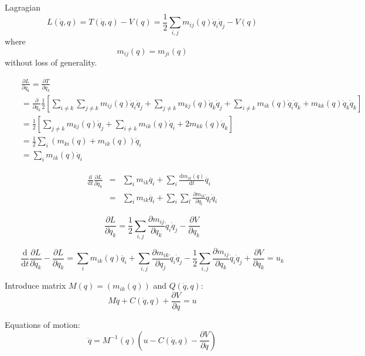 \documentclass[a4paper]{article}
\begin{document}
Lagragian
\begin{displaymath}
L(\dot{q}, q) = T(\dot{q}, q) - V(q) =
\frac{1}{2} \sum_{i,j} m_{ij}(q) \dot{q}_i \dot{q}_j - V(q)
\end{displaymath}
where
\begin{displaymath}
m_{ij}(q) = m_{ji}(q)
\end{displaymath}
without loss of generality.

\begin{eqnarray*}
&&\frac{\partial L}{\partial \dot{q_k}} =
\frac{\partial T}{\partial \dot{q_k}} \\
&& = \frac{\partial}{\partial \dot{q_k}}\frac{1}{2}\left[
\sum_{i\neq k} \sum_{j\neq k} m_{ij}(q) \dot{q}_i \dot{q}_j
+ \sum_{j \neq k} m_{kj}(q) \dot{q}_k \dot{q}_j
+ \sum_{i \neq k} m_{ik}(q) \dot{q}_i \dot{q}_k
+ m_{kk}(q) \dot{q}_k \dot{q}_k \right]\\
&& = \frac{1}{2} \left[\sum_{j \neq k} m_{kj}(q) \dot{q}_j
+ \sum_{i \neq k} m_{ik}(q) \dot{q}_i
+ 2 m_{kk}(q) \dot{q}_k\right]\\
&& = \frac{1}{2} \sum_i (m_{ki}(q) + m_{ik}(q)) \dot{q}_i\\
&& = \sum_i m_{ik}(q) \dot{q}_i
\end{eqnarray*}

\begin{eqnarray*}
\frac{\mathrm{d}}{\mathrm{d}t} \frac{\partial L}{\partial \dot{q}_k}
&=& \sum_i m_{ik} \ddot{q_i} + \sum_i \frac{\mathrm{d} m_{ik}(q)}{\mathrm{d} t} \dot{q_i}\\
&=& \sum_i m_{ik} \ddot{q_i} + \sum_i \sum_l \frac{\partial m_{ik}}{\partial q_l} \dot{q}_l \dot{q}_i
\end{eqnarray*}

\begin{displaymath}
\frac{\partial L}{\partial q_k} = \frac{1}{2} \sum_{i,j} \frac{\partial m_{ij}}{\partial q_k}
\dot{q}_i \dot{q}_j - \frac{\partial V}{\partial q_k}
\end{displaymath}

\begin{displaymath}
\frac{\mathrm{d}}{\mathrm{d}t} \frac{\partial L}{\partial \dot{q}_k} - \frac{\partial L}{\partial q_k}
= \sum_i m_{ik}(q) \ddot{q_i} + \sum_{i,j} \frac{\partial m_{ik}}{\partial q_j} \dot{q}_i \dot{q}_j
- \frac{1}{2} \sum_{i,j} \frac{\partial m_{ij}}{\partial q_k} \dot{q}_i \dot{q}_j
+ \frac{\partial V}{\partial q_k} = u_k
\end{displaymath}

Introduce matrix $M(q) = (m_{ik}(q))$ and $Q(\dot{q}, q)$:
\begin{displaymath}
M \ddot{q} + C(\dot{q}, q) + \frac{\partial V}{\partial q} = u
\end{displaymath}

Equations of motion:
\begin{displaymath}
\ddot{q} = M^{-1}(q) \left(u - C(\dot{q}, q) - \frac{\partial V}{\partial q}\right)
\end{displaymath}
\end{document}
